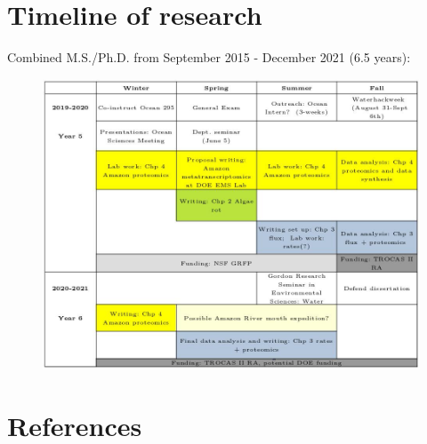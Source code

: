 \documentclass[12pt, letterpaper, twoside]{article}
\begin{document}
\newpage

\section{Timeline of research}

Combined M.S./Ph.D. from September 2015 - December 2021 (6.5 years):

\begin{figure}[!htb]
	\includegraphics[width=\linewidth]{gantt.jpg}
	
	\label{timeline}
\end{figure}




\newpage

\section{References}

\printbibliography[heading=none]
\end{document}
